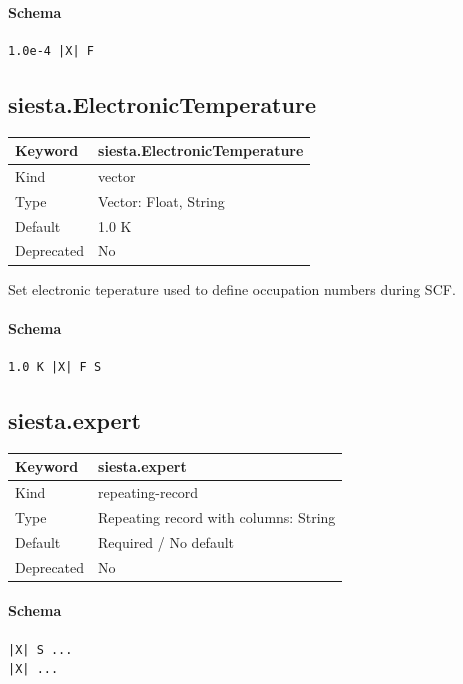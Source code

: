 \documentclass[11pt]{article}
\begin{document}
{{{{{\paragraph{Schema}
\begin{Verbatim}
1.0e-4 |X| F
\end{Verbatim}

\subsection{siesta.ElectronicTemperature}
\label{kw:siesta-ElectronicTemperature}
\begin{longtable}{|p{1.5in}|p{4.5in}|}
\hline
Keyword & siesta.ElectronicTemperature \\
\hline
Kind & vector \\
\hline
Type & Vector: Float, String \\
\hline
Default & 1.0 K \\
\hline
Deprecated & No \\
\hline
\end{longtable}
 Set electronic teperature used to define occupation numbers during SCF.

\paragraph{Schema}
\begin{Verbatim}
1.0 K |X| F S
\end{Verbatim}

\subsection{siesta.expert}
\label{kw:siesta-expert}
\begin{longtable}{|p{1.5in}|p{4.5in}|}
\hline
Keyword & siesta.expert \\
\hline
Kind & repeating-record \\
\hline
Type & Repeating record with columns: String \\
\hline
Default & Required / No default \\
\hline
Deprecated & No \\
\hline
\end{longtable}
\paragraph{Schema}
\begin{Verbatim}
|X| S ...
|X| ...
\end{Verbatim}

}}}}}
\end{document}
